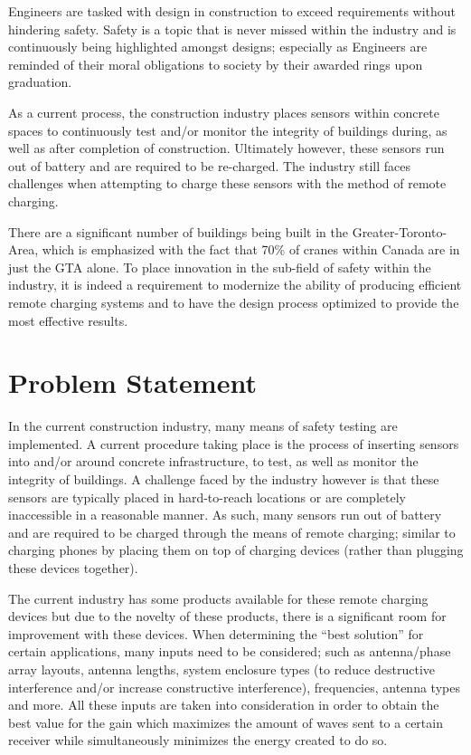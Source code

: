 \documentclass[12pt,a4]{report}
\begin{document}
Engineers are tasked with design in construction to exceed requirements without hindering safety. Safety is a topic that is never missed within the industry and is continuously being highlighted amongst designs; especially as Engineers are reminded of their moral obligations to society by their awarded rings upon graduation. 

As a current process, the construction industry places sensors within concrete spaces to continuously test and/or monitor the integrity of buildings during, as well as after completion of construction. Ultimately however, these sensors run out of battery and are required to be re-charged. The industry still faces challenges when attempting to charge these sensors with the method of remote charging.

There are a significant number of buildings being built in the Greater-Toronto-Area, which is emphasized with the fact that 70\% of cranes within Canada are in just the GTA alone. To place innovation in the sub-field of safety within the industry, it is indeed a requirement to modernize the ability of producing efficient remote charging systems and to have the design process optimized to provide the most effective results. 

\section*{Problem Statement}
In the current construction industry, many means of safety testing are implemented. A current procedure taking place is the process of inserting sensors into and/or around concrete infrastructure, to test, as well as monitor the integrity of buildings. A challenge faced by the industry however is that these sensors are typically placed in hard-to-reach locations or are completely inaccessible in a reasonable manner. As such, many sensors run out of battery and are required to be charged through the means of remote charging; similar to charging phones by placing them on top of charging devices (rather than plugging these devices together). 

The current industry has some products available for these remote charging devices but due to the novelty of these products, there is a significant room for improvement with these devices. When determining the “best solution” for certain applications, many inputs need to be considered; such as antenna/phase array layouts, antenna lengths, system enclosure types (to reduce destructive interference and/or increase constructive interference), frequencies, antenna types and more. All these inputs are taken into consideration in order to obtain the best value for the gain which maximizes the amount of waves sent to a certain receiver while simultaneously minimizes the energy created to do so. 
\end{document}
